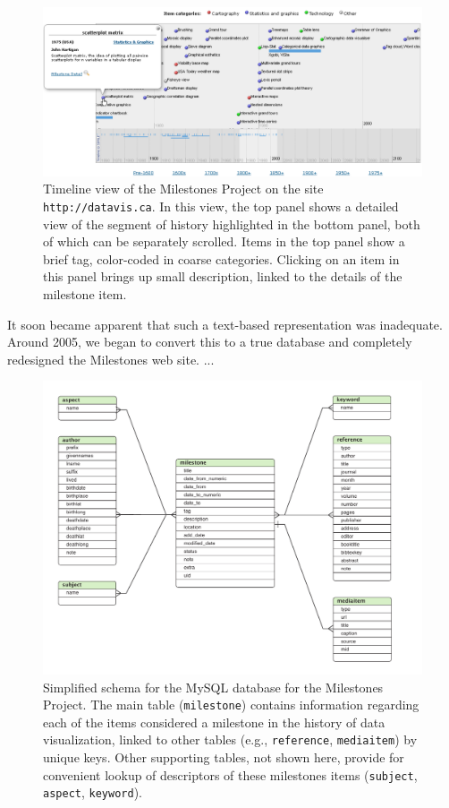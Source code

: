 \begin{figure}[!htb]
  \centering
  \includegraphics[width=\textwidth,clip]{fig/datavis-timeline2}
  \caption{Timeline view of the Milestones Project on the site \texttt{http://datavis.ca}. In this view,
  the top panel shows a detailed view of the segment of history highlighted in the bottom panel, both
  of which can be separately scrolled. Items in the top panel show a brief tag, color-coded in coarse
  categories. Clicking on an item in this panel brings up small description, linked to the details of
  the milestone item.
  }
  \label{fig:datavis-timeline2}
\end{figure}

It soon became apparent that such a text-based representation was inadequate.  Around 2005, we began
to convert this to a true database and
completely redesigned the Milestones web site. ...

\begin{figure}[!htb]
  \centering
  \includegraphics[width=\textwidth,clip]{fig/datavis-db-schema-reduced}
  \caption{Simplified schema for the MySQL database for the Milestones Project. The main 
  table (\texttt{milestone}) contains information regarding each of the items considered
  a milestone in the history of data visualization, linked to other tables 
  (e.g., \texttt{reference}, \texttt{mediaitem}) by unique keys.
  Other supporting tables, not shown here, provide for convenient lookup of 
  descriptors of these milestones items (\texttt{subject}, \texttt{aspect}, \texttt{keyword}).
  }
  \label{fig:datavis-db-schema}
\end{figure}


